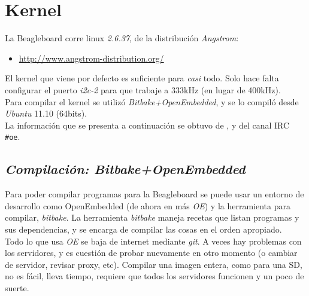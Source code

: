 \documentclass[main]{subfiles}
\begin{document}
\section{Kernel}
\label{sec:codigo:kernel}

La Beagleboard corre linux \textit{2.6.37}, de la distribución \textit{Angstrom}:
\begin{itemize}
\item \url{http://www.angstrom-distribution.org/}
\end{itemize}
El kernel que viene por defecto es suficiente para \textit{casi} todo. Solo hace falta configurar el puerto \textit{i2c-2} para que trabaje a 333kHz (en lugar de 400kHz).\\

Para compilar el kernel se utilizó \textit{Bitbake+OpenEmbedded}, y se lo compiló desde \textit{Ubuntu} 11.10 (64bits).\\

La información que se presenta a continuación se obtuvo de \cite{bib:oe-capture-changes}, \cite{bib:oe-angstrom-kernel-workflow} y del canal IRC \verb+#oe+.

\subsection{\textit{Compilación: Bitbake+OpenEmbedded}}
\label{sec:codigo:cross-compiling-bitbake-oe}

Para poder compilar programas para la Beagleboard se puede usar un entorno de desarrollo como OpenEmbedded (de ahora en más \textit{OE}) y la herramienta para compilar, \textit{bitbake}. La herramienta \textit{bitbake} maneja recetas que listan programas y sus dependencias, y se encarga de compilar las cosas en el orden apropiado.\\

Todo lo que usa \textit{OE} se baja de internet mediante \textit{git}. A veces hay problemas con los servidores, y es cuestión de probar nuevamente en otro momento (o cambiar de servidor, revisar proxy, etc). Compilar una imagen entera, como para una SD, no es fácil, lleva tiempo, requiere que todos los servidores funcionen y un poco de suerte.\\
\end{document}
